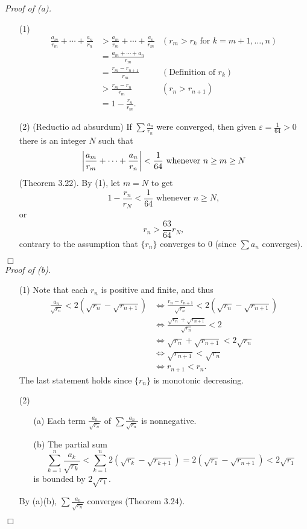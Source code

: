 \documentclass{article}
\begin{document}
\emph{Proof of (a).}
\begin{enumerate}
\item[(1)]
\begin{align*}
  \frac{a_m}{r_m} + \cdots + \frac{a_n}{r_n}
  &> \frac{a_m}{r_m} + \cdots + \frac{a_n}{r_m}
    &(\text{$r_m > r_k$ for $k=m+1,\ldots,n$}) \\
  &= \frac{a_m + \cdots + a_n}{r_m} \\
  &= \frac{r_m - r_{n+1}}{r_m}
    &(\text{Definition of $r_k$}) \\
  &> \frac{r_m - r_{n}}{r_m}
    &(r_n > r_{n+1}) \\
  &= 1 - \frac{r_n}{r_m}.
\end{align*}
\item[(2)]
(Reductio ad absurdum)
If $\sum \frac{a_n}{r_n}$ were converged,
then given $\varepsilon = \frac{1}{64} > 0$
there is an integer $N$ such that
$$\abs{\frac{a_m}{r_m} + \cdots + \frac{a_n}{r_n}} < \frac{1}{64}
\text{ whenever } n \geq m \geq N$$
(Theorem 3.22). By (1), let $m = N$ to get
$$1 - \frac{r_n}{r_N} < \frac{1}{64}
\text{ whenever } n \geq N,$$
or $$r_n > \frac{63}{64} r_N,$$
contrary to the assumption that
$\{r_n\}$ converges to $0$ (since $\sum a_n$ converges).
\end{enumerate}
$\Box$ \\

\emph{Proof of (b).}
\begin{enumerate}
\item[(1)]
Note that each $r_n$ is positive and finite, and thus
\begin{align*}
  \frac{a_n}{\sqrt{r_n}} < 2(\sqrt{r_n} - \sqrt{r_{n+1}})
  &\Longleftrightarrow
  \frac{r_n - r_{n+1}}{\sqrt{r_n}} < 2(\sqrt{r_n} - \sqrt{r_{n+1}}) \\
  &\Longleftrightarrow
  \frac{\sqrt{r_n} + \sqrt{r_{n+1}}}{\sqrt{r_n}} < 2 \\
  &\Longleftrightarrow
  \sqrt{r_n} + \sqrt{r_{n+1}} < 2 \sqrt{r_n} \\
  &\Longleftrightarrow
  \sqrt{r_{n+1}} < \sqrt{r_n} \\
  &\Longleftrightarrow
  r_{n+1} < r_n.
\end{align*}
The last statement holds since $\{r_n\}$ is monotonic decreasing.
\item[(2)]
  \begin{enumerate}
  \item[(a)]
  Each term $\frac{a_n}{\sqrt{r_n}}$ of $\sum \frac{a_n}{\sqrt{r_n}}$ is nonnegative.
  \item[(b)]
  The partial sum
  $$\sum_{k=1}^{n} \frac{a_k}{\sqrt{r_k}}
  < \sum_{k=1}^{n} 2(\sqrt{r_k} - \sqrt{r_{k+1}})
  = 2(\sqrt{r_1} - \sqrt{r_{n+1}})
  < 2\sqrt{r_1}$$
  is bounded by $2\sqrt{r_1}$.
  \end{enumerate}
  By (a)(b), $\sum \frac{a_n}{\sqrt{r_n}}$ converges (Theorem 3.24).
\end{enumerate}
$\Box$ \\\\
\end{document}
